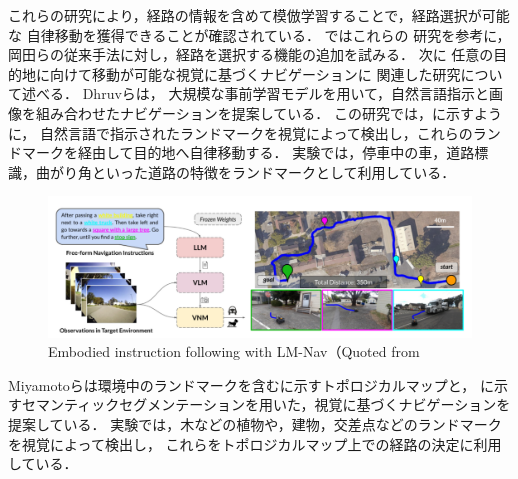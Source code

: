 これらの研究により，経路の情報を含めて模倣学習することで，経路選択が可能な
自律移動を獲得できることが確認されている．
ではこれらの
研究を参考に，岡田らの従来手法に対し，経路を選択する機能の追加を試みる．
\newpage
次に
任意の目的地に向けて移動が可能な視覚に基づくナビゲーションに
関連した研究について述べる．
Dhruvら\cite{shah2022lmnav}は，
大規模な事前学習モデルを用いて，自然言語指示と画像を組み合わせたナビゲーションを提案している．
この研究では，に示すように，
自然言語で指示されたランドマークを視覚によって検出し，これらのランドマークを経由して目的地へ自律移動する．
実験では，停車中の車，道路標識，曲がり角といった道路の特徴をランドマークとして利用している．

\begin{figure}[htbp]
    \centering
     \includegraphics[width=120mm]{images/pdf/lmnav.pdf}
     \caption[Embodied instruction following with LM-Nav]{Embodied instruction following with LM-Nav（Quoted from\cite{shah2022lmnav}}
     \label{fig:lmnav}
\end{figure}
\newpage
Miyamotoら\cite{miyamoto}は環境中のランドマークを含むに示すトポロジカルマップと，
に示すセマンティックセグメンテーションを用いた，視覚に基づくナビゲーションを提案している．
実験では，木などの植物や，建物，交差点などのランドマークを視覚によって検出し，
これらをトポロジカルマップ上での経路の決定に利用している．


